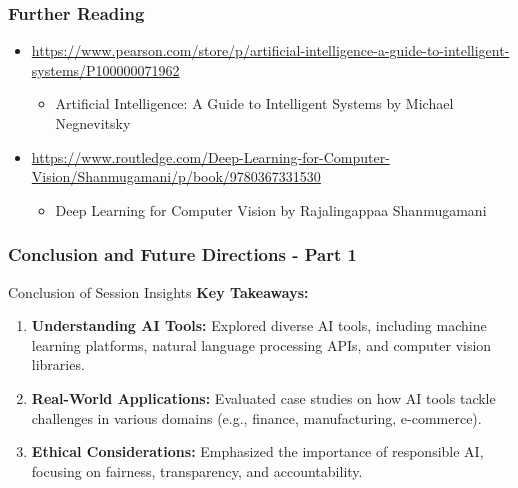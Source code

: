 \documentclass{beamer}
\begin{document}
\begin{frame}[fragile]
    \frametitle{Further Reading}
    \begin{itemize}
        \item \url{https://www.pearson.com/store/p/artificial-intelligence-a-guide-to-intelligent-systems/P100000071962} 
            \begin{itemize}
                \item Artificial Intelligence: A Guide to Intelligent Systems by Michael Negnevitsky
            \end{itemize}
        \item \url{https://www.routledge.com/Deep-Learning-for-Computer-Vision/Shanmugamani/p/book/9780367331530} 
            \begin{itemize}
                \item Deep Learning for Computer Vision by Rajalingappaa Shanmugamani
            \end{itemize}
    \end{itemize}
\end{frame}

\begin{frame}[fragile]
    \frametitle{Conclusion and Future Directions - Part 1}
    \begin{block}{Conclusion of Session Insights}
        \textbf{Key Takeaways:}
    \end{block}
    \begin{enumerate}
        \item \textbf{Understanding AI Tools:} Explored diverse AI tools, including machine learning platforms, natural language processing APIs, and computer vision libraries.
        \item \textbf{Real-World Applications:} Evaluated case studies on how AI tools tackle challenges in various domains (e.g., finance, manufacturing, e-commerce).
        \item \textbf{Ethical Considerations:} Emphasized the importance of responsible AI, focusing on fairness, transparency, and accountability.
    \end{enumerate}
\end{frame}
\end{document}
